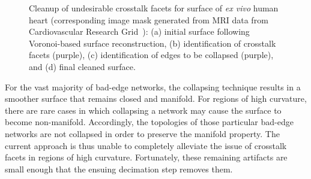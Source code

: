 \begin{figure}[b!]
{\label{fig:cross2-2}}		
%
\caption{Cleanup of undesirable crosstalk facets for surface of \textit{ex vivo} human heart (corresponding image mask generated from MRI data from Cardiovascular Research Grid~\cite{cvgg}): (a) initial surface following Voronoi-based surface reconstruction, (b) identification of crosstalk facets (purple), (c) identification of edges to be collapsed (purple), and (d) final cleaned surface.}
\label{fig:cross2}
\end{figure}
\noindent For the vast majority of bad-edge networks, the collapsing technique results in a smoother surface that remains closed and manifold. For regions of high curvature, there are rare cases in which collapsing a network may cause the surface to become non-manifold. Accordingly, the topologies of those particular bad-edge networks are not collapsed in order to preserve the manifold property. The current approach is thus unable to completely alleviate the issue of crosstalk facets in regions of high curvature. Fortunately, these remaining artifacts are small enough that the ensuing decimation step removes them. \\ \\
